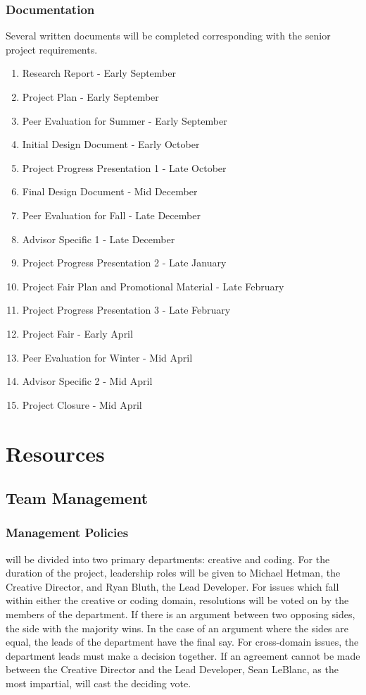 \documentclass{GlobalDocument}
\begin{document}
\subsection{Documentation}
Several written documents will be completed corresponding with the senior project requirements.
\begin{enumerate}
\item Research Report - Early September
\item Project Plan - Early September
\item Peer Evaluation for Summer - Early September
\item Initial Design Document - Early October
\item Project Progress Presentation 1 - Late October
\item Final Design Document - Mid December
\item Peer Evaluation for Fall - Late December
\item Advisor Specific 1 - Late December
\item Project Progress Presentation 2 - Late January
\item Project Fair Plan and Promotional Material - Late February
\item Project Progress Presentation 3 - Late February
\item Project Fair - Early April
\item Peer Evaluation for Winter - Mid April
\item Advisor Specific 2 - Mid April
\item Project Closure - Mid April
\end{enumerate}

\chapter{Resources}
\section{Team Management}
\subsection{Management Policies}
\ourteam{} will be divided into two primary departments: creative and coding. For the duration of the project, leadership roles will be given to Michael Hetman, the Creative Director, and Ryan Bluth, the Lead Developer. For issues which fall within either the creative or coding domain, resolutions will be voted on by the members of the department. If there is an argument between two opposing sides, the side with the majority wins. In the case of an argument where the sides are equal, the leads of the department have the final say. For cross-domain issues, the department leads must make a decision together. If an agreement cannot be made between the Creative Director and the Lead Developer, Sean LeBlanc, as the most impartial, will cast the deciding vote.
\end{document}
